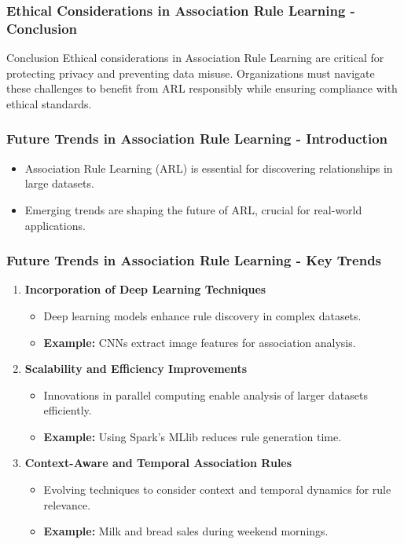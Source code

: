 \documentclass{beamer}
\begin{document}
\begin{frame}[fragile]
    \frametitle{Ethical Considerations in Association Rule Learning - Conclusion}
    \begin{block}{Conclusion}
        Ethical considerations in Association Rule Learning are critical for protecting privacy and preventing data misuse. Organizations must navigate these challenges to benefit from ARL responsibly while ensuring compliance with ethical standards.
    \end{block}
\end{frame}

\begin{frame}[fragile]
    \frametitle{Future Trends in Association Rule Learning - Introduction}
    \begin{itemize}
        \item Association Rule Learning (ARL) is essential for discovering relationships in large datasets.
        \item Emerging trends are shaping the future of ARL, crucial for real-world applications.
    \end{itemize}
\end{frame}

\begin{frame}[fragile]
    \frametitle{Future Trends in Association Rule Learning - Key Trends}
    \begin{enumerate}
        \item \textbf{Incorporation of Deep Learning Techniques}
        \begin{itemize}
            \item Deep learning models enhance rule discovery in complex datasets.
            \item \textbf{Example:} CNNs extract image features for association analysis.
        \end{itemize}
        
        \item \textbf{Scalability and Efficiency Improvements}
        \begin{itemize}
            \item Innovations in parallel computing enable analysis of larger datasets efficiently.
            \item \textbf{Example:} Using Spark's MLlib reduces rule generation time.
        \end{itemize}
        
        \item \textbf{Context-Aware and Temporal Association Rules}
        \begin{itemize}
            \item Evolving techniques to consider context and temporal dynamics for rule relevance.
            \item \textbf{Example:} Milk and bread sales during weekend mornings.
        \end{itemize}
    \end{enumerate}
\end{frame}
\end{document}
